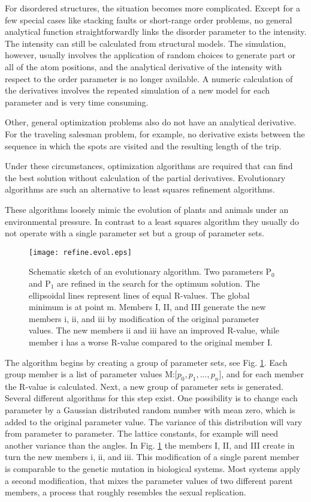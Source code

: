 For disordered structures, the situation becomes more complicated.
Except for a few special cases like stacking faults or short-range
order problems, no general analytical function straightforwardly 
links the disorder parameter to the intensity. The intensity 
can still be calculated from structural models. The simulation,
however, usually involves the application of random choices 
to generate part or all of the atom positions, and the analytical
derivative of the intensity with respect to the order parameter
is no longer available. A numeric calculation of the derivatives
involves the repeated simulation of a new model for each parameter
and is very time consuming.

Other, general optimization problems also do not have an 
analytical derivative. For the traveling salesman problem, for 
example, no derivative exists between the sequence in which the 
spots are visited and the resulting length of the trip.

Under these circumstances, optimization algorithms are required 
that can find the best solution without calculation of the 
partial derivatives. Evolutionary algorithms are such an alternative to 
least squares refinement algorithms.

These algorithms loosely mimic the evolution of plants and animals
under an environmental pressure. In contrast to a least squares
algorithm they usually do not operate with a single parameter set
but a group of parameter sets.

\begin{figure}[htbp]
   \texttt{[image: refine.evol.eps]}
   \caption{Schematic sketch of an evolutionary algorithm.
    Two parameters P$_{0}$ and P$_{1}$ are refined in the search
    for the optimum solution. The ellipsoidal lines represent 
    lines of equal R-values. The global minimum is at point m.
    Members I, II, and III generate the new members i, ii, and iii
    by modification of the original parameter values.
    The new members ii and iii have an improved R-value, while
    member i has a worse R-value compared to the original member I.}
   \label{evo-evol}
\end{figure}

The algorithm begins by creating a group of parameter sets, see Fig.
\ref{evo-evol}. Each group 
member is a list of parameter values M:[$p_{0}, p_{1}, ..., p_{n}$],
and for each member the R-value is calculated. Next, a new group of
parameter sets is generated. Several different algorithms for this
step exist. One possibility is to change each parameter by a Gaussian
distributed random number with mean zero, which is added to the original
parameter value. The variance of this distribution will vary from
parameter to parameter. The lattice constants, for example will
need another variance than the angles. In Fig. \ref{evo-evol}
the members I, II, and III create in turn the new members i, ii, and iii.
This modification  of a single parent member is comparable to the 
genetic mutation in biological systems. Most systems apply a second
modification, that mixes the parameter values of two different parent
members, a process that roughly resembles the sexual replication.

